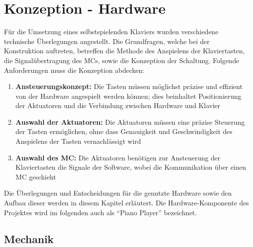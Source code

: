 
\graphicspath{ {./img/} }

\chapter{Konzeption - Hardware}\label{konzeptionHW}


Für die Umsetzung eines selbstspielenden Klaviers wurden verschiedene technische Überlegungen angestellt.
Die Grundfragen, welche bei der Konstruktion auftreten, betreffen die Methode des Anspielens der Klaviertasten, die
Signalübertragung des \ac{MC}s, sowie die Konzeption der Schaltung.
Folgende Anforderungen muss die Konzeption abdecken:


\begin{enumerate}
	\item \textbf{Ansteuerungskonzept:} Die Tasten müssen möglichst präzise und effizient von der Hardware angespielt werden können; dies beinhaltet Positionierung der Aktuatoren und die Verbindung zwischen Hardware und Klavier
	\item \textbf{Auswahl der Aktuatoren:} Die Aktuatoren müssen eine präzise Steuerung der Tasten ermöglichen, ohne dass Genauigkeit und Geschwindigkeit des Anspielens der Tasten vernachlässigt wird
	\item \textbf{Auswahl des \ac{MC}:} Die Aktuatoren benötigen zur Ansteuerung der Klaviertasten die Signale der Software, wobei die Kommunikation über einen \ac{MC} geschieht
\end{enumerate}

Die Überlegungen und Entscheidungen für die genutzte Hardware sowie den Aufbau dieser werden in diesem Kapitel erläutert.
Die Hardware-Komponente des Projektes wird im folgenden auch als \enquote{Piano Player} bezeichnet.

\section{Mechanik}\label{konzeptionHW-mechanik}

